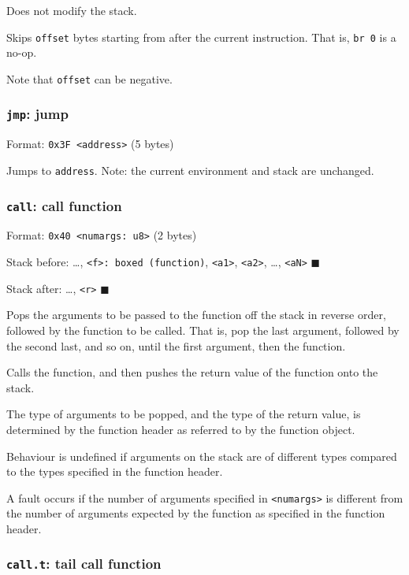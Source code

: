 Does not modify the stack.

Skips \texttt{offset} bytes starting from after the current instruction.
That is, \texttt{br\ 0} is a no-op.

Note that \texttt{offset} can be negative.

\subsubsection{\texorpdfstring{\texttt{jmp}: jump}{jmp: jump}}

Format: \texttt{0x3F\ \textless{}address\textgreater{}} (5 bytes)

Jumps to \texttt{address}. Note: the current environment and stack are
unchanged.

\subsubsection{\texorpdfstring{\texttt{call}: call
function}{call: call function}}

Format: \texttt{0x40\ \textless{}numargs:\ u8\textgreater{}} (2 bytes)

Stack before: \ldots,
\texttt{\textless{}f\textgreater{}:\ boxed\ (function)},
\texttt{\textless{}a1\textgreater{}},
\texttt{\textless{}a2\textgreater{}}, \ldots,
\texttt{\textless{}aN\textgreater{}} \(\blacksquare\)

Stack after: \ldots, \texttt{\textless{}r\textgreater{}}
\(\blacksquare\)

Pops the arguments to be passed to the function off the stack in reverse
order, followed by the function to be called. That is, pop the last
argument, followed by the second last, and so on, until the first
argument, then the function.

Calls the function, and then pushes the return value of the function
onto the stack.

The type of arguments to be popped, and the type of the return value, is
determined by the function header as referred to by the function object.

Behaviour is undefined if arguments on the stack are of different types
compared to the types specified in the function header.

A fault occurs if the number of arguments specified in
\texttt{\textless{}numargs\textgreater{}} is different from the number
of arguments expected by the function as specified in the function
header.

\subsubsection{\texorpdfstring{\texttt{call.t}: tail call
function}{call.t: tail call function}}

